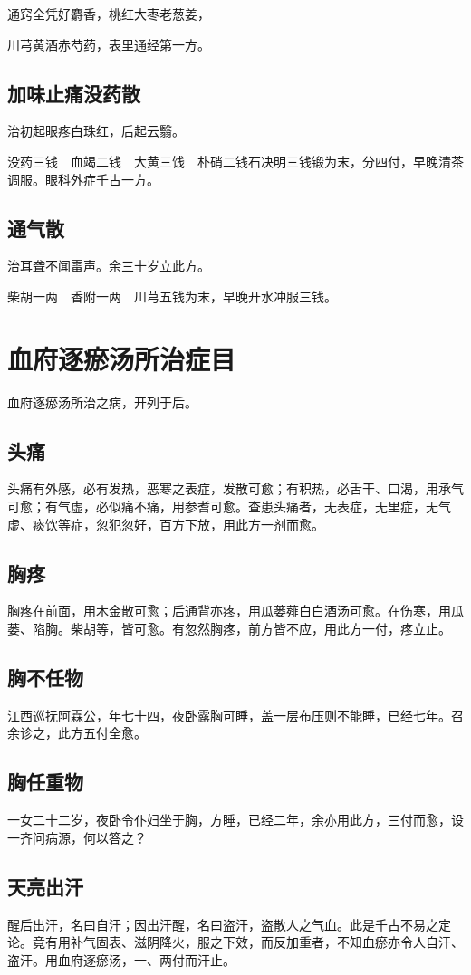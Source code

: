 \documentclass[a4paper,12pt,UTF8,twoside]{ctexbook}
\begin{document}
	通窍全凭好麝香，桃红大枣老葱姜，
	
	川芎黄酒赤芍药，表里通经第一方。
	\section{加味止痛没药散}
	
	
	治初起眼疼白珠红，后起云翳。
	
	没药三钱　血竭二钱　大黄三饯　朴硝二钱石决明三钱锻为末，分四付，早晚清茶调服。眼科外症千古一方。
	
	\section{通气散}
	
	
	治耳聋不闻雷声。余三十岁立此方。
	
	柴胡一两　香附一两　川芎五钱为末，早晚开水冲服三钱。
	
	\chapter{血府逐瘀汤所治症目}
	血府逐瘀汤所治之病，开列于后。
	\section{头痛}
	头痛有外感，必有发热，恶寒之表症，发散可愈；有积热，必舌干、口渴，用承气可愈；有气虚，必似痛不痛，用参耆可愈。查患头痛者，无表症，无里症，无气虚、痰饮等症，忽犯忽好，百方下放，用此方一剂而愈。
	\section{胸疼}
	胸疼在前面，用木金散可愈；后通背亦疼，用瓜蒌薤白白酒汤可愈。在伤寒，用瓜蒌、陷胸。柴胡等，皆可愈。有忽然胸疼，前方皆不应，用此方一付，疼立止。
	\section{胸不任物}
	江西巡抚阿霖公，年七十四，夜卧露胸可睡，盖一层布压则不能睡，已经七年。召余诊之，此方五付全愈。
	\section{胸任重物}
	一女二十二岁，夜卧令仆妇坐于胸，方睡，已经二年，余亦用此方，三付而愈，设一齐问病源，何以答之？
	\section{天亮出汗}
	醒后出汗，名曰自汗；因出汗醒，名曰盗汗，盗散人之气血。此是千古不易之定论。竟有用补气固表、滋阴降火，服之下效，而反加重者，不知血瘀亦令人自汗、盗汗。用血府逐瘀汤，一、两付而汗止。
\end{document}
